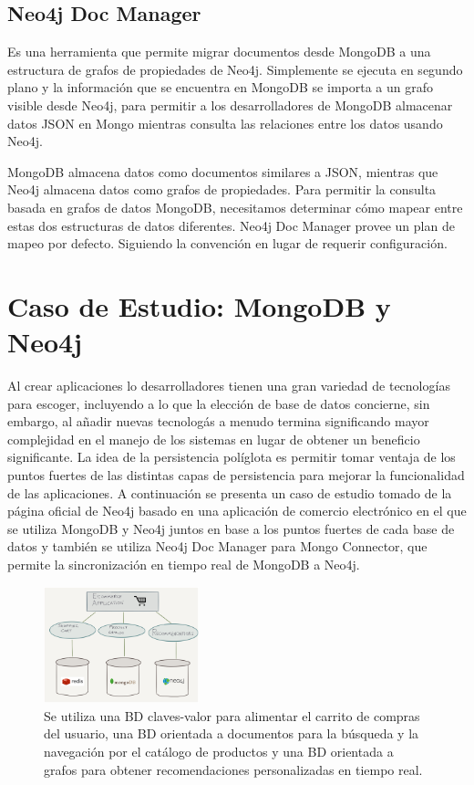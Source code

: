 \documentclass[conference]{IEEEtran}
\begin{document}
\subsection{Neo4j Doc Manager}
Es una herramienta que permite migrar documentos desde MongoDB a una estructura de grafos de propiedades de Neo4j. Simplemente se ejecuta en segundo plano y la informaci\'on que se encuentra en MongoDB se importa a un grafo visible desde Neo4j, para permitir a los desarrolladores de MongoDB almacenar datos JSON en Mongo mientras consulta las relaciones entre los datos usando Neo4j.

MongoDB almacena datos como documentos similares a JSON, mientras que Neo4j almacena datos como grafos de propiedades. Para permitir la consulta basada en grafos de datos MongoDB, necesitamos determinar c\'omo mapear entre estas dos estructuras de datos diferentes. Neo4j Doc Manager provee un plan de mapeo por defecto. Siguiendo la convenci\'on en lugar de requerir configuraci\'on.\cite{doc}

\section{Caso de Estudio: MongoDB y Neo4j}
Al crear aplicaciones lo desarrolladores tienen una gran variedad de tecnolog\'ias para escoger, incluyendo a lo que la elecci\'on de base de datos  concierne, sin embargo, al a\~nadir nuevas tecnolog\'as a menudo termina significando mayor complejidad en el manejo de los sistemas en lugar de obtener un beneficio significante. La idea de la persistencia pol\'iglota es permitir tomar ventaja de los puntos fuertes de las distintas capas de persistencia para mejorar la funcionalidad de las aplicaciones. A continuaci\'on se presenta un caso de estudio tomado de la p\'agina oficial de Neo4j \cite{caso} basado en una aplicaci\'on de comercio electr\'onico en el que se utiliza MongoDB y Neo4j juntos en base a los puntos fuertes de cada base de datos y tambi\'en se utiliza Neo4j Doc Manager para Mongo Connector, que permite la sincronizaci\'on en tiempo real de MongoDB a Neo4j.

\begin{figure}[!h]
\centering
\includegraphics[width=0.4\textwidth]{5}
\caption{Se utiliza una BD claves-valor para alimentar el carrito de compras del usuario, una BD orientada a  documentos para la b\'usqueda y la navegaci\'on por el cat\'alogo de productos y una BD orientada a grafos para obtener recomendaciones personalizadas en tiempo real.}
\label{fig5}
\end{figure}
\end{document}
